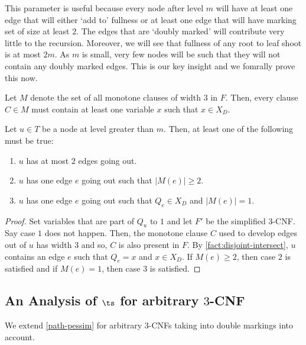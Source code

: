 This parameter is useful because every node after level $m$ will have at least one edge that will either `add to' fullness or at least one edge that will have marking set of size at least $2$. The edges that are `doubly marked' will contribute very little to the recursion. Moreover, we will see that fullness of any root to leaf shoot is at most $2m$. As $m$ is small, very few nodes will be such that they will not contain any doubly marked edges. This is our key insight and we fomrally prove this now.

\begin{fact}
\label{fact:disjoint-intersect}
   Let $M$ denote the set of all monotone clauses of width $3$ in $F$. Then, every clause $C\in M$ must contain at least one variable $x$ such that $x\in X_D$.
\end{fact}

\begin{lemma}
\label{lemma:disjoint-marking}
Let $u\in T$ be a node at level greater than $m$. Then, at least one of the following must be true:
\begin{enumerate}
  \item
  $u$ has at most $2$ edges going out. 

  \item
  $u$ has one edge $e$ going out such that $|M(e)| \ge 2$.

  \item
  $u$ has one edge $e$ going out such that $Q_e\in X_D$ and $|M(e)| = 1$.
\end{enumerate}
\end{lemma}

\begin{proof}
Set variables that are part of $Q_u$ to $1$ and let $F'$ be the simplified $3$-CNF.
Say case $1$ does not happen. Then, the monotone clause $C$ used to develop edges out of $u$ has width $3$ and so, $C$ is also present in $F$. By \cref{fact:disjoint-intersect}, $u$ contains an edge $e$ such that $Q_e = x$ and $x\in X_D$. If $M(e) \ge 2$, then case $2$ is satisfied and if $M(e) = 1$, then case $3$ is satisfied.
\end{proof}


\subsection{An Analysis of $\ts$ for arbitrary $3$-CNF}

We extend \cref{path-pessim} for arbitrary $3$-CNFs taking into double markings into account.

